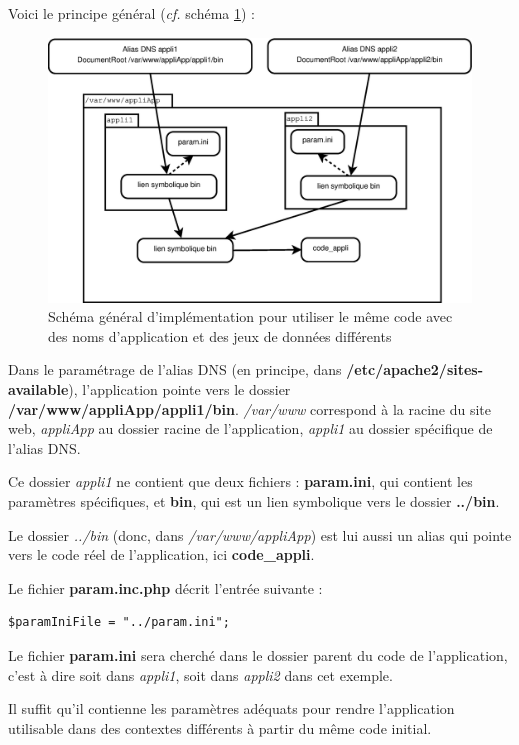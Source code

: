Voici le principe général (\textit{cf.} schéma \ref{dnsmultipleschema})  :
\begin{figure}[th]
\label{dnsmultipleschema}
\includegraphics[width=\linewidth]{dessin/dnsmultiple}
\caption{Schéma général d'implémentation pour utiliser le même code avec des noms d'application et des jeux de données différents}
\end{figure}

Dans le paramétrage de l'alias DNS (en principe, dans \textbf{/etc/apache2/sites-available}), l'application pointe vers le dossier \textbf{/var/www/appliApp/appli1/bin}. 
\textit{/var/www} correspond à la racine du site web, \textit{appliApp} au dossier racine de l'application, \textit{appli1} au dossier spécifique de l'alias DNS.

Ce dossier \textit{appli1} ne contient que deux fichiers : \textbf{param.ini}, qui contient les paramètres spécifiques, et \textbf{bin}, qui est un lien symbolique vers le dossier \textbf{../bin}. 

Le dossier \textit{../bin} (donc, dans \textit{/var/www/appliApp}) est lui aussi un alias qui pointe vers le code réel de l'application, ici \textbf{code\_appli}.

Le fichier \textbf{param.inc.php} décrit l'entrée suivante :
\begin{lstlisting}
$paramIniFile = "../param.ini";
\end{lstlisting}

Le fichier \textbf{param.ini} sera cherché dans le dossier parent du code de l'application, c'est à dire soit dans \textit{appli1}, soit dans \textit{appli2} dans cet exemple.

Il suffit qu'il contienne les paramètres adéquats pour rendre l'application utilisable dans des contextes différents à partir du même code initial.